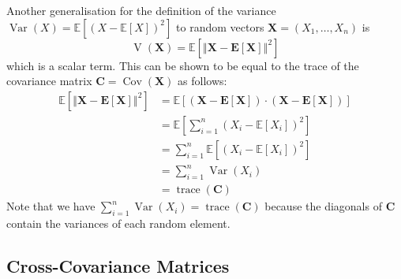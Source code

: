 \documentclass[11pt]{report} %
\begin{document}
Another generalisation for the definition of the variance $\operatorname{Var}\left(X\right) = \mathbb{E}\left[\left(X - \mathbb{E}\left[X\right]\right)^{2}\right]$ to random vectors $\mathbf{X} = \left(X_{1}, \dots, X_{n}\right)$ is
\begin{equation}
\operatorname{V}\left(\mathbf{X}\right) = \mathbb{E}\left[\left\Vert \mathbf{X} - \mathbf{E}\left[\mathbf{X}\right]\right\Vert^{2} \right]
\end{equation}
which is a scalar term. This can be shown to be equal to the trace of the covariance matrix $\mathbf{C} = \operatorname{Cov}\left(\mathbf{X}\right)$ as follows:
\begin{align}
\mathbb{E}\left[\left\Vert \mathbf{X} - \mathbf{E}\left[\mathbf{X}\right]\right\Vert^{2} \right] &= \mathbb{E}\left[\left(\mathbf{X} - \mathbf{E}\left[\mathbf{X}\right]\right)\cdot \left(\mathbf{X} - \mathbf{E}\left[\mathbf{X}\right]\right) \right] \\
&= \mathbb{E}\left[\sum_{i = 1}^{n}\left(X_{i} - \mathbb{E}\left[X_{i}\right]\right)^{2}\right] \\
&= \sum_{i = 1}^{n}\mathbb{E}\left[\left(X_{i} - \mathbb{E}\left[X_{i}\right]\right)^{2}\right] \\
&= \sum_{i = 1}^{n}\operatorname{Var}\left(X_{i}\right) \\
&= \operatorname{trace}\left(\mathbf{C}\right)
\end{align}
Note that we have $\sum_{i = 1}^{n}\operatorname{Var}\left(X_{i}\right) = \operatorname{trace}\left(\mathbf{C}\right)$ because the diagonals of $\mathbf{C}$ contain the variances of each random element.

\subsection{Cross-Covariance Matrices}
\end{document}
